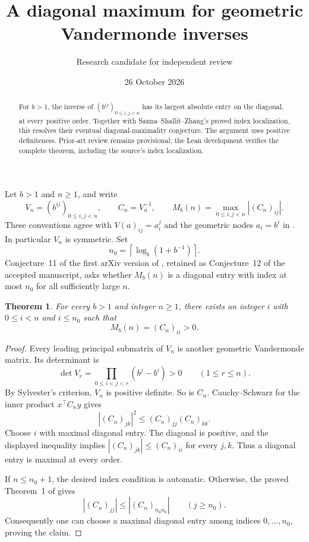 \documentclass[11pt]{article}
\title{A diagonal maximum for geometric Vandermonde inverses}
\author{Research candidate for independent review}
\date{26 October 2026}
\newtheorem{theorem}{Theorem}
\begin{document}
\maketitle
\begin{abstract}
For $b>1$, the inverse of $(b^{ij})_{0\le i,j<n}$ has its largest absolute entry on the diagonal, at every positive order. Together with Sanna--Shallit--Zhang's proved index localization, this resolves their eventual diagonal-maximality conjecture. The argument uses positive definiteness. Prior-art review remains provisional; the Lean development verifies the complete theorem, including the source's index localization.
\end{abstract}

Let $b>1$ and $n\ge1$, and write
\[
 V_n=(b^{ij})_{0\le i,j<n},\qquad C_n=V_n^{-1},\qquad
 M_b(n)=\max_{0\le i,j<n}|(C_n)_{ij}|.
\]
These conventions agree with $V(a)_{ij}=a_i^j$ and the geometric nodes $a_i=b^i$ in \cite{SSZ}. In particular $V_n$ is symmetric. Set
\[
 n_0=\left\lceil\log_b(1+b^{-1})\right\rceil.
\]
Conjecture~11 of the first arXiv version of \cite{SSZ}, retained as Conjecture~12 of the accepted manuscript, asks whether $M_b(n)$ is a diagonal entry with index at most $n_0$ for all sufficiently large $n$.

\begin{theorem}
For every $b>1$ and integer $n\ge1$, there exists an integer $i$ with $0\le i<n$ and $i\le n_0$ such that
\[
 M_b(n)=(C_n)_{ii}>0.
\]
\end{theorem}
\begin{proof}
Every leading principal submatrix of $V_n$ is another geometric Vandermonde matrix. Its determinant is
\[
 \det V_r=\prod_{0\le i<j<r}(b^j-b^i)>0\qquad(1\le r\le n).
\]
By Sylvester's criterion, $V_n$ is positive definite. So is $C_n$. Cauchy--Schwarz for the inner product $x^\top C_n y$ gives
\[
 |(C_n)_{jk}|^2\le (C_n)_{jj}(C_n)_{kk}.
\]
Choose $i$ with maximal diagonal entry. The diagonal is positive, and the displayed inequality implies $|(C_n)_{jk}|\le(C_n)_{ii}$ for every $j,k$. Thus a diagonal entry is maximal at every order.

If $n\le n_0+1$, the desired index condition is automatic. Otherwise, the proved Theorem~1 of \cite{SSZ} gives
\[
 |(C_n)_{jj}|\le |(C_n)_{n_0n_0}|\qquad(j\ge n_0).
\]
Consequently one can choose a maximal diagonal entry among indices $0,\ldots,n_0$, proving the claim.
\end{proof}
\end{document}
